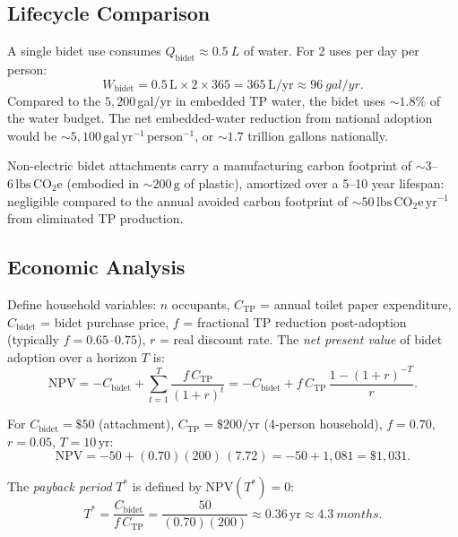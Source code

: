 \documentclass[aps,prfluids,reprint,amsmath,amssymb,floatfix]{revtex4-2}
\begin{document}
\subsection{Lifecycle Comparison}

A single bidet use consumes $Q_\mathrm{bidet} \approx \SI{0.5}{L}$ of water.
For 2 uses per day per person:
\begin{equation}
    W_\mathrm{bidet} = 0.5\,\mathrm{L} \times 2 \times 365 = 365\,\mathrm{L/yr}
    \approx \SI{96}{gal/yr}.
\end{equation}
Compared to the $5{,}200$\,gal/yr in embedded TP water, the bidet uses
$\sim\!1.8\%$ of the water budget. The net embedded-water reduction from
national adoption would be $\sim\!5{,}100\,\mathrm{gal\,yr^{-1}\,person^{-1}}$,
or $\sim\!1.7$ trillion gallons nationally.

Non-electric bidet attachments carry a manufacturing carbon footprint of
$\sim\!3$--$6\,\mathrm{lbs\,CO_2e}$ (embodied in $\sim\!200\,\mathrm{g}$
of plastic), amortized over a 5--10 year lifespan: negligible compared to
the annual avoided carbon footprint of $\sim\!50\,\mathrm{lbs\,CO_2e\,yr^{-1}}$
from eliminated TP production.

\subsection{Economic Analysis}

Define household variables: $n$ occupants, $C_\mathrm{TP}$ = annual toilet
paper expenditure, $C_\mathrm{bidet}$ = bidet purchase price, $f$ = fractional
TP reduction post-adoption (typically $f = 0.65$--$0.75$), $r$ = real discount
rate. The \emph{net present value} of bidet adoption over a horizon $T$ is:
\begin{equation}
    \mathrm{NPV} = -C_\mathrm{bidet} + \sum_{t=1}^{T}\frac{f\,C_\mathrm{TP}}{(1+r)^t}
    = -C_\mathrm{bidet} + f\,C_\mathrm{TP}\,\frac{1-(1+r)^{-T}}{r}.
    \label{eq:npv}
\end{equation}

For $C_\mathrm{bidet} = \$50$ (attachment), $C_\mathrm{TP} = \$200/\mathrm{yr}$
(4-person household), $f = 0.70$, $r = 0.05$, $T = 10\,\mathrm{yr}$:
\begin{equation}
    \mathrm{NPV} = -50 + (0.70)(200)\,(7.72) = -50 + 1{,}081 = \$1{,}031.
    \label{eq:npvval}
\end{equation}

The \emph{payback period} $T^*$ is defined by $\mathrm{NPV}(T^*) = 0$:
\begin{equation}
    T^* = \frac{C_\mathrm{bidet}}{f\,C_\mathrm{TP}}
    = \frac{50}{(0.70)(200)} \approx 0.36\,\mathrm{yr} \approx
    \SI{4.3}{months}.
    \label{eq:payback}
\end{equation}
\end{document}
